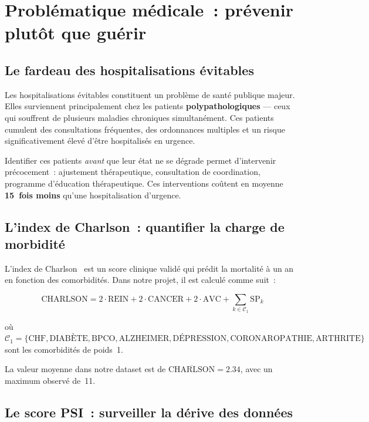 \section{Problématique médicale~: prévenir plutôt que guérir}

\subsection{Le fardeau des hospitalisations évitables}

Les hospitalisations évitables constituent un problème de santé publique majeur.
Elles surviennent principalement chez les patients \textbf{polypathologiques} ---
ceux qui souffrent de plusieurs maladies chroniques simultanément. Ces patients
cumulent des consultations fréquentes, des ordonnances multiples et un risque
significativement élevé d'être hospitalisés en urgence.

Identifier ces patients \textit{avant} que leur état ne se dégrade permet
d'intervenir précocement~: ajustement thérapeutique, consultation de coordination,
programme d'éducation thérapeutique. Ces interventions coûtent en moyenne
\textbf{15~fois moins} qu'une hospitalisation d'urgence.

\subsection{L'index de Charlson~: quantifier la charge de morbidité}

L'index de Charlson~\cite{charlson1987new} est un score clinique validé qui
prédit la mortalité à un an en fonction des comorbidités. Dans notre projet, il
est calculé comme suit~:

\begin{equation}
\label{eq:charlson}
\text{CHARLSON} = 2 \cdot \text{REIN} + 2 \cdot \text{CANCER} +
2 \cdot \text{AVC} + \sum_{k \in \mathcal{C}_1} \text{SP}_k
\end{equation}

\noindent où $\mathcal{C}_1 = \{\text{CHF}, \text{DIABÈTE}, \text{BPCO},
\text{ALZHEIMER}, \text{DÉPRESSION}, \text{CORONAROPATHIE},
\text{ARTHRITE}\}$ sont les comorbidités de poids~1.

\noindent La valeur moyenne dans notre dataset est de $\overline{\text{CHARLSON}}
= 2.34$, avec un maximum observé de~11.

\subsection{Le score PSI~: surveiller la dérive des données}

